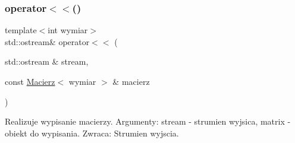 \subsubsection{\texorpdfstring{operator$<$$<$()}{operator<<()}}
{\footnotesize\ttfamily template$<$int wymiar$>$ \\
std\+::ostream\& operator$<$$<$ (\begin{DoxyParamCaption}\item[{std\+::ostream \&}]{stream,  }\item[{const \mbox{\hyperlink{class_macierz}{Macierz}}$<$ wymiar $>$ \&}]{macierz }\end{DoxyParamCaption})\hspace{0.3cm}{\ttfamily [inline]}}

Realizuje wypisanie macierzy. Argumenty\+: stream -\/ strumien wyjsica, matrix -\/ obiekt do wypisania. Zwraca\+: Strumien wyjscia. 